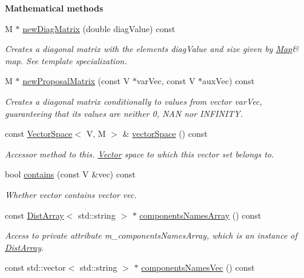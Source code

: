 \begin{Indent}{\bf Mathematical methods}
\begin{DoxyCompactItemize}
M $\ast$ \hyperlink{class_q_u_e_s_o_1_1_vector_space_afe36d0db933c49cb4508b83dd17d33b6}{new\-Diag\-Matrix} (double diag\-Value) const 
\begin{DoxyCompactList}\small\item\em Creates a diagonal matrix with the elements {\ttfamily diag\-Value} and size given by \hyperlink{class_q_u_e_s_o_1_1_map}{Map}\& map. See template specialization. \end{DoxyCompactList}\item 
M $\ast$ \hyperlink{class_q_u_e_s_o_1_1_vector_space_ab1e7c7ce9aedb494fb2a6fb1fac6a46b}{new\-Proposal\-Matrix} (const V $\ast$var\-Vec, const V $\ast$aux\-Vec) const 
\begin{DoxyCompactList}\small\item\em Creates a diagonal matrix conditionally to values from vector {\ttfamily var\-Vec}, guaranteeing that its values are neither 0, N\-A\-N nor I\-N\-F\-I\-N\-I\-T\-Y. \end{DoxyCompactList}\item 
const \hyperlink{class_q_u_e_s_o_1_1_vector_space}{Vector\-Space}$<$ V, M $>$ \& \hyperlink{class_q_u_e_s_o_1_1_vector_space_ab8bb323280e36a42ac04623b42369da5}{vector\-Space} () const 
\begin{DoxyCompactList}\small\item\em Accessor method to {\ttfamily this}. \hyperlink{class_q_u_e_s_o_1_1_vector}{Vector} space to which {\ttfamily this} vector set belongs to. \end{DoxyCompactList}\item 
bool \hyperlink{class_q_u_e_s_o_1_1_vector_space_ab31d8677d0199e10e1aac9526e2b41e8}{contains} (const V \&vec) const 
\begin{DoxyCompactList}\small\item\em Whether  vector contains vector {\ttfamily vec}. \end{DoxyCompactList}\item 
const \hyperlink{class_q_u_e_s_o_1_1_dist_array}{Dist\-Array}$<$ std\-::string $>$ $\ast$ \hyperlink{class_q_u_e_s_o_1_1_vector_space_a89284638a11e1449149f471a563bb72c}{components\-Names\-Array} () const 
\begin{DoxyCompactList}\small\item\em Access to private attribute m\-\_\-components\-Names\-Array, which is an instance of \hyperlink{class_q_u_e_s_o_1_1_dist_array}{Dist\-Array}. \end{DoxyCompactList}\item 
const std\-::vector$<$ std\-::string $>$ $\ast$ \hyperlink{class_q_u_e_s_o_1_1_vector_space_aa315ff4efb4be69a64e341e3ebddca56}{components\-Names\-Vec} () const 

\end{DoxyCompactItemize}
\end{Indent}
